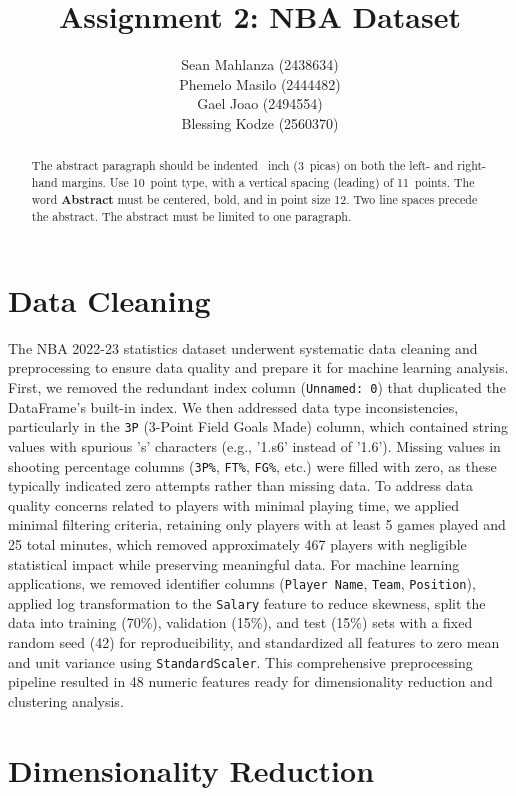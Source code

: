 \documentclass{article}
\title{Assignment 2: NBA Dataset}
\author{%
 Sean Mahlanza (2438634) \\ 
 Phemelo Masilo (2444482) \\
 Gael Joao (2494554) \\
 Blessing Kodze (2560370) \\
}
\begin{document}
\maketitle

\begin{abstract}
  The abstract paragraph should be indented ~inch (3~picas) on
  both the left- and right-hand margins. Use 10~point type, with a vertical
  spacing (leading) of 11~points.  The word \textbf{Abstract} must be centered,
  bold, and in point size 12. Two line spaces precede the abstract. The abstract
  must be limited to one paragraph.
\end{abstract}

\section{Data Cleaning}

The NBA 2022-23 statistics dataset underwent systematic data cleaning and preprocessing to ensure data quality and prepare it for machine learning analysis. First, we removed the redundant index column (\texttt{Unnamed: 0}) that duplicated the DataFrame's built-in index. We then addressed data type inconsistencies, particularly in the \texttt{3P} (3-Point Field Goals Made) column, which contained string values with spurious 's' characters (e.g., '1.s6' instead of '1.6'). Missing values in shooting percentage columns (\texttt{3P\%}, \texttt{FT\%}, \texttt{FG\%}, etc.) were filled with zero, as these typically indicated zero attempts rather than missing data. To address data quality concerns related to players with minimal playing time, we applied minimal filtering criteria, retaining only players with at least 5 games played and 25 total minutes, which removed approximately 467 players with negligible statistical impact while preserving meaningful data. For machine learning applications, we removed identifier columns (\texttt{Player Name}, \texttt{Team}, \texttt{Position}), applied log transformation to the \texttt{Salary} feature to reduce skewness, split the data into training (70\%), validation (15\%), and test (15\%) sets with a fixed random seed (42) for reproducibility, and standardized all features to zero mean and unit variance using \texttt{StandardScaler}. This comprehensive preprocessing pipeline resulted in 48 numeric features ready for dimensionality reduction and clustering analysis.

\section{Dimensionality Reduction}
\end{document}
